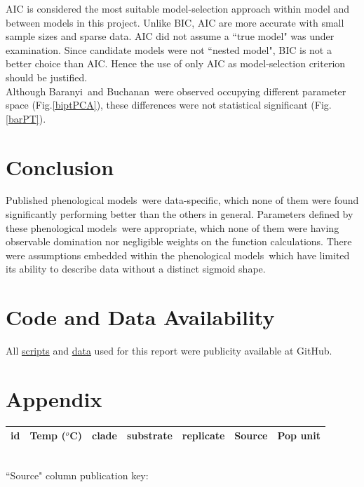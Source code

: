 \documentclass[a4paper, 11pt]{article}
\newcommand{\pms}{phenological models}
\newcommand{\fba}{Baranyi}
\newcommand{\fbu}{Buchanan}
\begin{document}
	AIC is considered the most suitable model-selection approach within model and between models in this project.  Unlike BIC, AIC are more accurate with small sample sizes\autocite{acquah2010comparison,kuha2004aic} and sparse data\autocite{kuha2004aic}.  AIC did not assume a ``true model" was under examination\autocite{aho2014model,vrieze2012model,yang2005can}.  Since candidate models were not ``nested model", BIC is not a better choice than AIC\autocite{wang2006comparison}.  Hence the use of only AIC as model-selection criterion should be justified.\\
	
	Although \fba\ and \fbu\ were observed occupying different parameter space (Fig.\ref{biptPCA}), these differences were not statistical significant (Fig.\ref{barPT}).
	
	\section*{Conclusion}
	Published \pms\ were data-specific, which none of them were found significantly performing better than the others in general.  Parameters defined by these \pms\ were appropriate, which none of them were having observable domination nor negligible weights on the function calculations.  There were assumptions embedded within the \pms\ which have limited its ability to describe data without a distinct sigmoid shape.
	
	\section*{Code and Data Availability}
	All \href{https://github.com/ph-u/CMEECourseWork_pmH/tree/master/MiniProject/code}{scripts} and \href{https://github.com/ph-u/CMEECourseWork_pmH/tree/master/MiniProject/data}{data} used for this report were publicity available at GitHub.
	\nocite{*}\printbibliography
	
	\section*{Appendix}
\begin{table}
		\caption{Table showing dataset id details for Fig.\ref{lineOut}}\label{table:source}
	\begin{tabular}{l|llllll}
		id&Temp ($^{o}$C)&clade&substrate&replicate&Source&Pop unit\\\hline
	\end{tabular}\\
	``Source" column publication key:\\
\begin{longtable}{p{.05\linewidth}p{.9\linewidth}}
\end{longtable}
\end{table}
\end{document}
